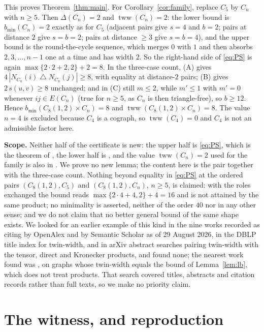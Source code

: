 \documentclass[11pt]{amsart}
\theoremstyle{remark}
\DeclareMathOperator{\tww}{tww}
\newcommand{\sd}{\mathbin{\triangle}}
\begin{document}
This proves Theorem~\ref{thm:main}. For Corollary~\ref{cor:family}, replace
$C_5$ by $C_n$ with $n\ge5$. Then $\Delta(C_n)=2$ and $\tww(C_n)=2$: the lower
bound is $b_{\min}(C_n)=2$ exactly as for $C_5$ (adjacent pairs give
$s=4$ and $b=2$; pairs at distance $2$ give $s=b=2$; pairs at distance $\ge3$
give $s=b=4$), and the upper bound is the round-the-cycle sequence, which merges
$0$ with $1$ and then absorbs $2,3,\dots,n-1$ one at a time and has width $2$.
So the right-hand side of \eqref{eq:PS} is again
$\max\{2\cdot2+2,2\}+2=8$. In the three-case count, (A) gives
$4\,|N_{C_n}(i)\sd N_{C_n}(j)|\ge8$, with equality at distance-$2$ pairs;
(B) gives $2\,s(u,v)\ge8$ unchanged; and in (C) still $m\le2$, while
$m'\le1$ with $m'=0$ whenever $ij\in E(C_n)$ (true for $n\ge5$, as $C_n$ is
then triangle-free), so $b\ge12$. Hence $b_{\min}(C_8(1,2)\times C_n)=8$ and
$\tww(C_8(1,2)\times C_n)=8$. The value $n=4$ is excluded because $C_4$ is a
cograph, so $\tww(C_4)=0$ and $C_4$ is not an admissible factor here.

\medskip
\noindent\textbf{Scope.}
Neither half of the certificate is new: the upper half is \eqref{eq:PS}, which
is the theorem of \cite{PS}, the lower half is \cite[Lemma~3.1]{AHKO}, and the
value $\tww(C_n)=2$ used for the family is also in \cite{AHKO}. We prove no new
lemma; the content here is the pair together with the three-case count. Nothing
beyond equality in \eqref{eq:PS} at the ordered pairs $(C_8(1,2),C_5)$ and
$(C_8(1,2),C_n)$, $n\ge5$, is claimed: with the roles exchanged the bound reads
$\max\{2\cdot4+4,2\}+4=16$ and is not attained by the same product; no
minimality is asserted, neither of the order $40$ nor in any other sense; and we
do not claim that no better general bound of the same shape exists. We looked
for an earlier example of this kind in the nine works recorded as citing
\cite{PS} by OpenAlex and by Semantic Scholar as of 29 August 2026, in the DBLP
title index for twin-width, and in arXiv abstract searches pairing twin-width
with the tensor, direct and Kronecker products, and found none; the nearest
work found was \cite{HIRV}, on graphs whose twin-width equals the bound of
Lemma~\ref{lem:lb}, which does not treat products. That search covered titles,
abstracts and citation records rather than full texts, so we make no priority
claim.

\section{The witness, and reproduction}
\end{document}

